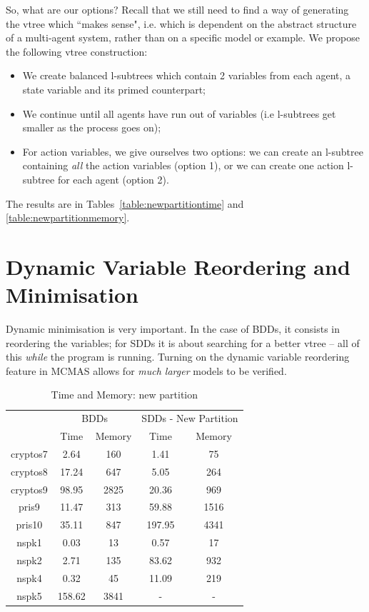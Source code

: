 \documentclass[11pt]{report}
\begin{document}
So, what are our options? Recall that we still need to find a way of generating the vtree which ``makes sense", i.e. which is dependent on the abstract structure of a multi-agent system, rather than on a specific model or example. 
We propose the following vtree construction:
\begin{itemize}
\item We create balanced l-subtrees which contain 2 variables from each agent, a state variable and its primed counterpart;
\item We continue until all agents have run out of variables (i.e l-subtrees get smaller as the process goes on);
\item For action variables, we give ourselves two options: we can create an l-subtree containing \textit{all }the action variables (option 1), or we can create one action l-subtree for each agent (option 2). 
\end{itemize}

The results are in Tables~\ref{table:newpartitiontime} and \ref{table:newpartitionmemory}. 

\section{Dynamic Variable Reordering and Minimisation}

Dynamic minimisation is very important. In the case of BDDs, it consists in reordering the variables; for SDDs it is about searching for a better vtree -- all of this \textit{while} the program is running. Turning on the dynamic variable reordering feature in MCMAS allows for \textit{much larger} models to be verified.
\begin{table}
\centering
\begin{tabular}{|*{5}{c|}}
\hline
 & \multicolumn{2}{c|}{BDDs} & \multicolumn{2}{c|}{SDDs - New Partition } \\ \cline{2-5}
 & Time & Memory & Time & Memory \\ \hline
cryptos7 &2.64& 160& 1.41 & 75 \\ \hline
cryptos8 &17.24& 647& 5.05 & 264 \\ \hline
cryptos9 &98.95 &2825& 20.36 & 969 \\ \hline
pris9 &11.47 &313& 59.88 & 1516 \\ \hline
pris10 &35.11& 847& 197.95 & 4341 \\ \hline
nspk1 &0.03& 13 & 0.57 & 17 \\ \hline
nspk2 &2.71& 135& 83.62 & 932 \\ \hline
nspk4 &0.32& 45 & 11.09 & 219 \\ \hline
nspk5 &158.62& 3841& - &-  \\ \hline
\end{tabular}
\caption{Time and Memory: new partition}
\label{table:newpartition}
\end{table}
\end{document}

